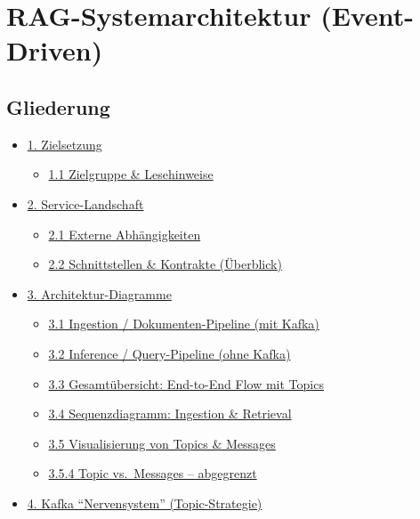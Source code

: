 \section{RAG-Systemarchitektur
(Event-Driven)}\label{rag-systemarchitektur-event-driven}

\subsection{Gliederung}\label{gliederung}

\begin{itemize}
\tightlist
\item
  \hyperref[1-zielsetzung]{1. Zielsetzung}

  \begin{itemize}
  \tightlist
  \item
    \hyperref[11-zielgruppe--lesehinweise]{1.1 Zielgruppe \&
    Lesehinweise}
  \end{itemize}
\item
  \hyperref[2-service-landschaft]{2. Service-Landschaft}

  \begin{itemize}
  \tightlist
  \item
    \hyperref[21-externe-abhuxe4ngigkeiten]{2.1 Externe Abhängigkeiten}
  \item
    \hyperref[22-schnittstellen--kontrakte-uxfcberblick]{2.2
    Schnittstellen \& Kontrakte (Überblick)}
  \end{itemize}
\item
  \hyperref[3-architektur-diagramme]{3. Architektur-Diagramme}

  \begin{itemize}
  \tightlist
  \item
    \hyperref[31-ingestion--dokumenten-pipeline-mit-kafka]{3.1 Ingestion
    / Dokumenten-Pipeline (mit Kafka)}
  \item
    \hyperref[32-inference--query-pipeline-ohne-kafka]{3.2 Inference /
    Query-Pipeline (ohne Kafka)}
  \item
    \hyperref[33-gesamtuxfcbersicht-end-to-end-flow-mit-topics]{3.3
    Gesamtübersicht: End-to-End Flow mit Topics}
  \item
    \hyperref[34-sequenzdiagramm-ingestion--retrieval-synchron--asynchron]{3.4
    Sequenzdiagramm: Ingestion \& Retrieval}
  \item
    \hyperref[35-visualisierung-von-topics--messages]{3.5 Visualisierung
    von Topics \& Messages}
  \item
    \hyperref[354-topic-vs-messages--abgegrenzt-szenario-document-received]{3.5.4
    Topic vs.~Messages -- abgegrenzt}
  \end{itemize}
\item
  \hyperref[4-kafka-nervensystem-topic-strategie]{4. Kafka
  ``Nervensystem'' (Topic-Strategie)}


\end{itemize}
